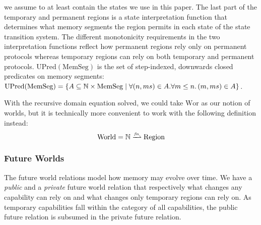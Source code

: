 \documentclass[format=acmsmall, review=true, screen=true]{acmart}
\newcommand{\finparfun}{\xrightharpoonup{\textit{\tiny{fin}}}}
\newcommand{\plaindom}[1]{\mathrm{#1}}
\newcommand{\HeapSegments}{\plaindom{MemSeg}}
\newcommand{\nats}{\mathbb{N}}
\newcommand{\Regions}{\plaindom{Region}}
\newcommand{\Worlds}{\plaindom{World}}
\newcommand{\Wor}{\plaindom{Wor}}
\newcommand{\UPred}[1]{\plaindom{UPred}(#1)}
\begin{document}
we assume to at least contain the states we use in this paper. The last part of
the temporary and permanent regions is a state interpretation function that
determines what memory segments the region permits in each state of the state
transition system.  The different monotonicity requirements in the two
interpretation functions reflect how permanent regions rely only on permanent
protocols whereas temporary regions can rely on both temporary and permanent
protocols.  $\UPred{\HeapSegments}$ is the set of step-indexed, downwards closed
predicates on memory segments:
$\UPred{\HeapSegments} = \{ A \subseteq  \nats \times
\HeapSegments \mid 
\forall (n, ms) \in A. \forall m
\leq n\ldotp (m, ms) \in A\}$. 
\

With the recursive domain equation solved, we could take $\Wor$ as our notion of
worlds, but it is technically more convenient to work with the following
definition instead:
\[
  \Worlds = \nats \finparfun \Regions
\]

\subsubsection{Future Worlds}
\label{subsec:future-worlds} 
The future world relations model how memory may evolve over time.
We have a \emph{public} and a \emph{private} future world relation that respectively what changes any capability can rely on and what changes only temporary regions can rely on.
As temporary capabilities fall within the category of all capabilities, the public future relation is subsumed in the private future relation.
\end{document}
